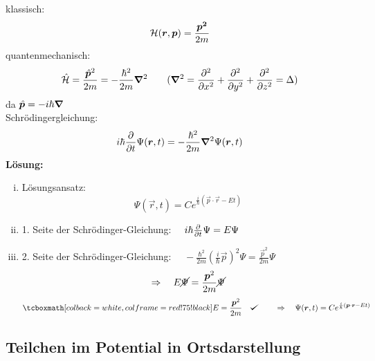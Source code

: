 klassisch:
\begin{equation*}
\ham (\vec{r}, \vec{p}) = \frac{\vec{p^2}}{2 m}
\end{equation*}
quantenmechanisch:
\begin{equation*}
\hat{\ham} = \frac{\hat{\vec{p}}^2}{2 m} = - \frac{\hbar^2}{2 m} \vabla^2 \qquad (\vabla^2 = \prt{^2}{x^2} + \prt{^2}{y^2} + \prt{^2}{z^2} = \Delta)
\end{equation*}
da $ \hat{\vec{p}} = - i \hbar \vabla $\\[5pt]
Schrödingergleichung:
\begin{equation*}
i \hbar \prt{}{t} \Psi(\vec{r},t) = - \frac{\hbar^2}{2 m} \vabla^2 \Psi(\vec{r},t)
\end{equation*}
\textbf{Lösung:}
\begin{enumerate}[i)]
	\item Lösungsansatz:
	\begin{equation*}
	\Psi(\vec{r},t) = Ce^{\frac{i}{\hbar} (\vec{p} \cdot \vec{r} - E t)}
	\end{equation*}
	\item 1. Seite der Schrödinger-Gleichung: $ \quad i \hbar \prt{}{t} \Psi = E \Psi $
	\item 2. Seite der Schrödinger-Gleichung: $ \quad -\frac{\hbar^2}{2 m} \left(\frac{i}{\hbar} \vec{p}\right)^2 \Psi = \frac{\vec{p}^2}{2 m} \Psi $
	\begin{equation*}
	\Rightarrow \quad E \cancel{\Psi} = \frac{\vec{p}^2}{2 m} \cancel{\Psi}
	\end{equation*}
	\begin{equation*}
	\rmbox{E = \frac{\vec{p}^2}{2 m}} \quad \checkmark \qquad \Rightarrow \quad \Psi(\vec{r},t) = C e^{\frac{i}{\hbar} (\vec{p} \cdot \vec{r} - E t)}
	\end{equation*}
\end{enumerate}

\subsection{Teilchen im Potential in Ortsdarstellung}

